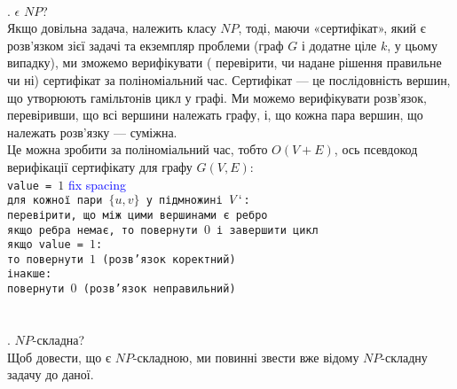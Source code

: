 \documentclass[14pt]{article}
\begin{document}
\begin{spacing}{1.175}
    \\
    . \hamcycle \(\epsilon\) \(NP\)?\\
        Якщо довільна задача, належить класу \(NP\), тоді, маючи «сертифікат», який є розв'язком зієї задачі та екземпляр проблеми (граф \(G\) і додатне ціле \(k\), у цьому випадку), ми зможемо верифікувати ( перевірити, чи надане рішення правильне чи ні) сертифікат за поліноміальний час. Сертифікат — це послідовність вершин, що утворюють гамільтонів цикл у графі. Ми можемо верифікувати розв'язок, перевіривши, що всі вершини належать графу, і, що кожна пара вершин, що належать розв’язку — суміжна.\\ Це можна зробити за поліноміальний час, тобто \(O(V + E)\), ось
        псевдокод верифікації сертифікату для графу \(G(V, E)\):
        \\
            
        \quad \texttt{value = \(1\)} \textcolor{blue}{ fix spacing} 
        \\
        
        \quad \texttt{для кожної пари \( \{u, v\}\) у підмножині \(V`\):}
        \\
        
        \quad \texttt{\quad перевірити, що між цими вершинами є ребро}
        \\
        
        \quad \texttt{\quad якщо ребра немає, то повернути \(0\) і завершити цикл}
        \\
        
        \quad \texttt{якщо value = \(1\):}
        \\
        
        \quad \texttt{\quad то повернути \(1\) (розв'язок коректний)}
        \\

        \quad \texttt{інакше:}
        \\
        
        \quad \texttt{\quad повернути \(0\) (розв'язок неправильний)}\\
        \\
        
        
        \\
        . \hamcycle \(NP\)-складна? \\
        Щоб довести, що \hamcycle є \(NP\)-складною, ми повинні звести вже відому \(NP\)-складну задачу до даної.
        \\
        

\end{spacing}
\end{document}

